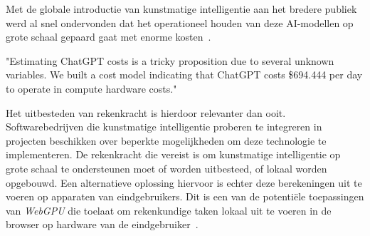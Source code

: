 
Met de globale introductie van kunstmatige intelligentie aan het bredere publiek werd al snel ondervonden dat het operationeel houden van deze AI-modellen op grote schaal gepaard gaat met enorme kosten~\autocite{Patel2023}.

\begin{displayquote}
    "Estimating ChatGPT costs is a tricky proposition due to several unknown variables. We built a cost model indicating that ChatGPT costs \$694.444 per day to operate in compute hardware costs."
\end{displayquote}

Het uitbesteden van rekenkracht is hierdoor relevanter dan ooit. Softwarebedrijven die kunstmatige intelligentie proberen te integreren in projecten beschikken over beperkte mogelijkheden om deze technologie te implementeren. De rekenkracht die vereist is om kunstmatige intelligentie op grote schaal te ondersteunen moet of worden uitbesteed, of lokaal worden opgebouwd. Een alternatieve oplossing hiervoor is echter deze berekeningen uit te voeren op apparaten van eindgebruikers. Dit is een van de potentiële toepassingen van \textit{WebGPU} die toelaat om rekenkundige taken lokaal uit te voeren in de browser op hardware van de eindgebruiker~\autocite{Wallez2023}.

\section{}%
\label{sec:onderzoeksvraag}


